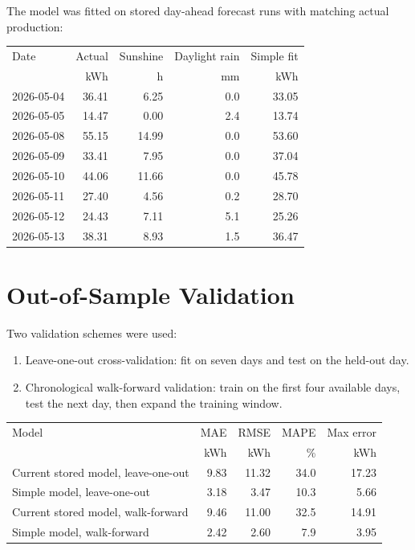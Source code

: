 \documentclass[11pt,a4paper]{article}
\begin{document}
The model was fitted on stored day-ahead forecast runs with matching actual production:

\begin{center}
\begin{tabular}{lrrrr}
\toprule
Date & Actual & Sunshine & Daylight rain & Simple fit \\
 & kWh & h & mm & kWh \\
\midrule
2026-05-04 & 36.41 & 6.25 & 0.0 & 33.05 \\
2026-05-05 & 14.47 & 0.00 & 2.4 & 13.74 \\
2026-05-08 & 55.15 & 14.99 & 0.0 & 53.60 \\
2026-05-09 & 33.41 & 7.95 & 0.0 & 37.04 \\
2026-05-10 & 44.06 & 11.66 & 0.0 & 45.78 \\
2026-05-11 & 27.40 & 4.56 & 0.2 & 28.70 \\
2026-05-12 & 24.43 & 7.11 & 5.1 & 25.26 \\
2026-05-13 & 38.31 & 8.93 & 1.5 & 36.47 \\
\bottomrule
\end{tabular}
\end{center}

\section{Out-of-Sample Validation}

Two validation schemes were used:

\begin{enumerate}
  \item Leave-one-out cross-validation: fit on seven days and test on the held-out day.
  \item Chronological walk-forward validation: train on the first four available days, test the next day, then expand the training window.
\end{enumerate}

\begin{center}
\begin{tabular}{lrrrr}
\toprule
Model & MAE & RMSE & MAPE & Max error \\
 & kWh & kWh & \% & kWh \\
\midrule
Current stored model, leave-one-out & 9.83 & 11.32 & 34.0 & 17.23 \\
Simple model, leave-one-out & 3.18 & 3.47 & 10.3 & 5.66 \\
Current stored model, walk-forward & 9.46 & 11.00 & 32.5 & 14.91 \\
Simple model, walk-forward & 2.42 & 2.60 & 7.9 & 3.95 \\
\bottomrule
\end{tabular}
\end{center}
\end{document}
